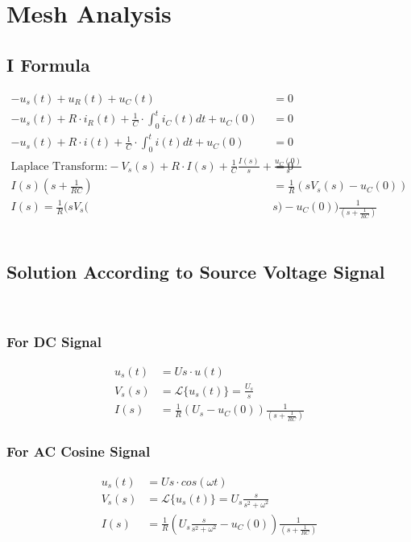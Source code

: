 \documentclass{article}
\begin{document}
\section{Mesh Analysis}
\subsection{I Formula}
\begin{align*}
    -u_s(t)+u_R(t)+u_C(t)&=0 \\
    -u_s(t)+R \cdot i_R(t) + \frac{1}{C}\cdot \int_{0}^{t}i_C(t)dt +u_C(0) &=0 \\
    -u_s(t)+R \cdot i(t) + \frac{1}{C}\cdot \int_{0}^{t}i(t)dt +u_C(0) &=0\\
    \text{Laplace Transform:}     -V_s(s)+R \cdot I(s) + \frac{1}{C} \frac{I(s)}{s} +\frac{u_C(0)}{s} &=0\\
    I(s) (s+ \frac{1}{RC}) &= \frac{1}{R} (s V_s(s) - u_C(0)) \\
    I(s) = \frac{1}{R} (s V_s(&s) - u_C(0))\frac{1}{(s+ \frac{1}{RC})}
\end{align*}\\

\subsection{Solution According to Source Voltage Signal}\\
\subsubsection{For DC Signal}
\begin{align*}
    u_s(t) &= Us \cdot u(t)\\
    V_s(s) &= \mathcal{L} \big\{u_s(t)\big\} = \frac{U_s}{s}\\
    I(s) &= \frac{1}{R} (U_s - u_C(0))\frac{1}{(s+ \frac{1}{RC})}
\end{align*}
\subsubsection{For AC Cosine Signal}
\begin{align*}
    u_s(t) &= Us \cdot cos(\omega t)\\
    V_s(s) &= \mathcal{L} \big\{u_s(t)\big\} =U_s \frac{s}{s^2+\omega^2}\\
    I(s) &= \frac{1}{R} (U_s \frac{s}{s^2+\omega^2} - u_C(0))\frac{1}{(s+ \frac{1}{RC})}
\end{align*}
\end{document}
